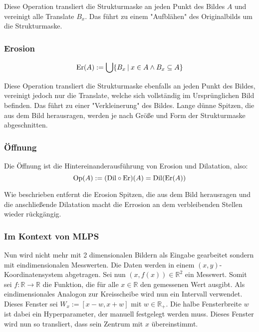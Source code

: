 \documentclass{article}
\newcommand{\R}[0]{\mathbb{R}}
\begin{document}
Diese Operation transliert die Strukturmaske an jeden Punkt des Bildes $A$ und vereinigt alle Translate $B_x$. Das führt zu einem "Aufblähen" des Originalbilds um die Strukturmaske.

\subsubsection{Erosion}
\begin{equation}
    {\rm Er}(A) := \bigcup \{B_x \: | \: x \in A \land B_x \subseteq A\}
\end{equation}

Diese Operation transliert die Strukturmaske ebenfalls an jeden Punkt des Bildes, vereinigt jedoch nur die Translate, welche sich vollständig im Ursprünglichen Bild befinden.
Das führt zu einer "Verkleinerung" des Bildes. Lange dünne Spitzen, die aus dem Bild herausragen, werden je nach Größe und Form der Strukturmaske abgeschnitten.

\subsubsection{Öffnung}

Die Öffnung ist die Hintereinanderausführung von Erosion und Dilatation, also:
\begin{equation}
    {\rm Op}(A) := ({\rm Dil} \circ {\rm Er})(A) = {\rm Dil}({\rm Er}(A))
\end{equation}

Wie beschrieben entfernt die Erosion Spitzen, die aus dem Bild herausragen und die anschließende Dilatation macht die Errosion an dem verbleibenden Stellen wieder rückgängig.

\subsubsection{Im Kontext von MLPS}

Nun wird nicht mehr mit 2 dimensionalen Bildern als Eingabe gearbeitet sondern mit eindimensionalen Messwerten. Die Daten werden in einem $(x,y)$-Koordinatensystem abgetragen. 
Sei nun $(x,f(x)) \in \R^2$ ein Messwert. Somit sei $f:\R \to \R$ die Funktion, die für alle $x \in \R$ den gemessenen Wert ausgibt. Als eindimensionales Analogon zur Kreisscheibe wird nun ein Intervall verwendet. 
Dieses Fenster sei $W_x := [x-w, x+w]$ mit $w \in \R_+$. Die halbe Fensterbreite $w$ ist dabei ein Hyperparameter, der manuell festgelegt werden muss. 
Dieses Fenster wird nun so transliert, dass sein Zentrum mit $x$ übereinstimmt.
\end{document}
